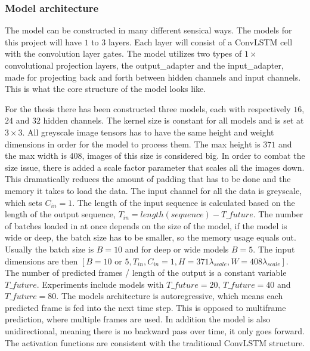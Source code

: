 \documentclass[a4paper,12pt]{article}
\begin{document}
\subsubsection{Model architecture}
The model can be constructed in many different sensical ways. The models for this project will have $1$ to $3$ layers. Each layer will consist of a ConvLSTM cell with the convolution layer gates. The model utilizes two types of $1 \times $ convolutional projection layers, the output\_adapter and the input\_adapter, made for projecting back and forth between hidden channels and input channels. This is what the core structure of the model looks like.

For the thesis there has been constructed three models, each with respectively $16$, $24$ and $32$ hidden channels. The kernel size is constant for all models and is set at $3 \times 3$. All greyscale image tensors has to have the same height and weight dimensions in order for the model to process them. The max height is $371$ and the max width is $408$, images of this size is considered big. In order to combat the size issue, there is added a scale factor parameter that scales all the images down. This dramatically reduces the amount of padding that has to be done and the memory it takes to load the data.
The input channel for all the data is greyscale, which sets $C_{in} = 1$. The length of the input sequence is calculated based on the length of the output sequence, $T_{in} = length(sequence) - T\_future$. The number of batches loaded in at once depends on the size of the model, if the model is wide or deep, the batch size has to be smaller, so the memory usage equals out. Usually the batch size is $B=10$ and for deep or wide models $B=5$. The input dimensions are then $[B = 10 \text{  or  } 5, T_{in}, C_{in}=1, H=371\lambda_{scale}, W=408\lambda_{scale}]$.
The number of predicted frames / length of the output is a constant variable $T\_future$. Experiments include models with $T\_future = 20$, $T\_future = 40$ and $T\_future = 80$. The models architecture is autoregressive, which means each predicted frame is fed into the next time step. This is opposed to multiframe prediction, where multiple frames are used. In addition the model is also unidirectional, meaning there is no backward pass over time, it only goes forward. The activation functions are consistent with the traditional ConvLSTM structure.
\end{document}
